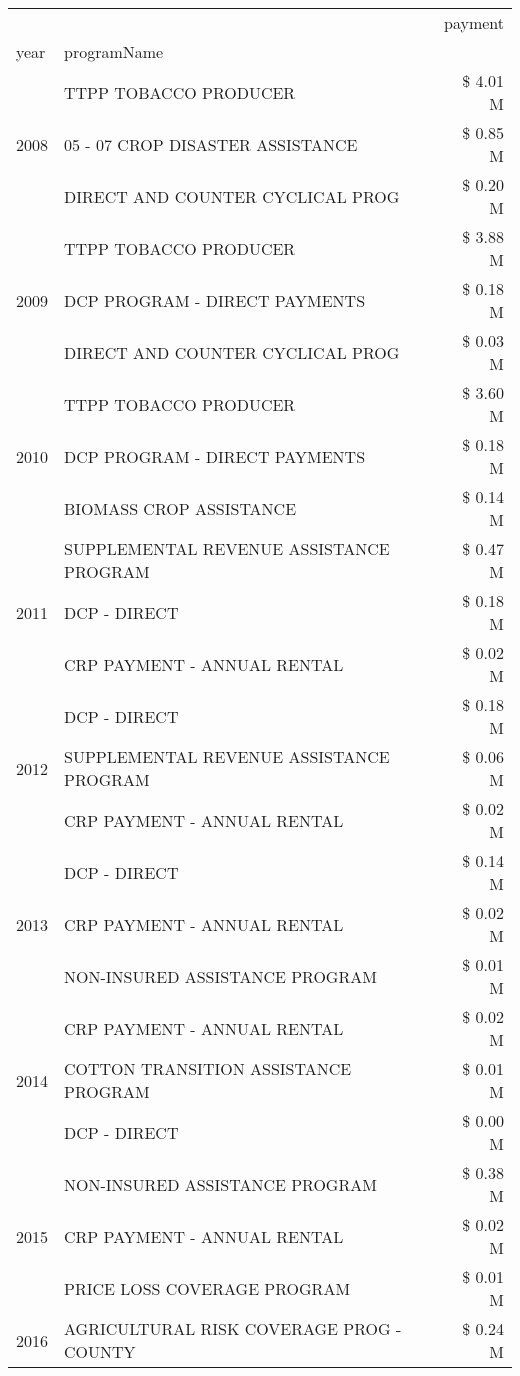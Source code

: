 \begin{tabular}{llr}
\toprule
 &  & payment \\
year & programName &  \\
\midrule
\multirow[t]{3}{*}{2008} & TTPP TOBACCO PRODUCER & \$ 4.01 M \\
 & 05 - 07 CROP DISASTER ASSISTANCE & \$ 0.85 M \\
 & DIRECT AND COUNTER CYCLICAL PROG & \$ 0.20 M \\
\cline{1-3}
\multirow[t]{3}{*}{2009} & TTPP TOBACCO PRODUCER & \$ 3.88 M \\
 & DCP PROGRAM - DIRECT PAYMENTS & \$ 0.18 M \\
 & DIRECT AND COUNTER CYCLICAL PROG & \$ 0.03 M \\
\cline{1-3}
\multirow[t]{3}{*}{2010} & TTPP TOBACCO PRODUCER & \$ 3.60 M \\
 & DCP PROGRAM - DIRECT PAYMENTS & \$ 0.18 M \\
 & BIOMASS CROP ASSISTANCE & \$ 0.14 M \\
\cline{1-3}
\multirow[t]{3}{*}{2011} & SUPPLEMENTAL REVENUE ASSISTANCE PROGRAM & \$ 0.47 M \\
 & DCP - DIRECT & \$ 0.18 M \\
 & CRP PAYMENT - ANNUAL RENTAL & \$ 0.02 M \\
\cline{1-3}
\multirow[t]{3}{*}{2012} & DCP - DIRECT & \$ 0.18 M \\
 & SUPPLEMENTAL REVENUE ASSISTANCE PROGRAM & \$ 0.06 M \\
 & CRP PAYMENT - ANNUAL RENTAL & \$ 0.02 M \\
\cline{1-3}
\multirow[t]{3}{*}{2013} & DCP - DIRECT & \$ 0.14 M \\
 & CRP PAYMENT - ANNUAL RENTAL & \$ 0.02 M \\
 & NON-INSURED ASSISTANCE PROGRAM & \$ 0.01 M \\
\cline{1-3}
\multirow[t]{3}{*}{2014} & CRP PAYMENT - ANNUAL RENTAL & \$ 0.02 M \\
 & COTTON TRANSITION ASSISTANCE PROGRAM & \$ 0.01 M \\
 & DCP - DIRECT & \$ 0.00 M \\
\cline{1-3}
\multirow[t]{3}{*}{2015} & NON-INSURED ASSISTANCE PROGRAM & \$ 0.38 M \\
 & CRP PAYMENT - ANNUAL RENTAL & \$ 0.02 M \\
 & PRICE LOSS COVERAGE PROGRAM & \$ 0.01 M \\
\cline{1-3}
\multirow[t]{3}{*}{2016} & AGRICULTURAL RISK COVERAGE PROG - COUNTY & \$ 0.24 M \\

\end{tabular}
